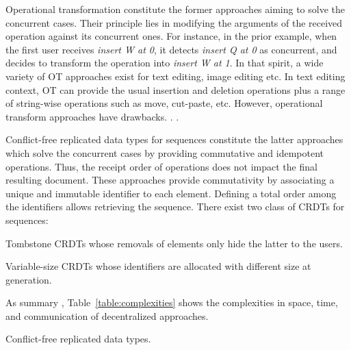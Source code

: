 \begin{asparadesc}
\item [Operational transformation] constitute the former approaches aiming to
  solve the concurrent cases. Their principle lies in modifying the arguments of
  the received operation against its concurrent ones. For instance, in the prior
  example, when the first user receives \emph{insert W at 0}, it detects
  \emph{insert Q at 0} as concurrent, and decides to transform the operation
  into \emph{insert W at 1}.  In that spirit, a wide variety of OT approaches
  exist for text editing, image editing etc. In text editing context, OT can
  provide the usual insertion and deletion operations plus a range of
  string-wise operations such as move, cut-paste, etc. However, operational
  transform approaches have drawbacks. . .
\item [Conflict-free replicated data types] for sequences constitute the latter
  approaches which solve the concurrent cases by providing commutative and
  idempotent operations. Thus, the receipt order of operations does not impact
  the final resulting document. These approaches provide commutativity by
  associating a unique and immutable identifier to each element. Defining a
  total order among the identifiers allows retrieving the sequence. There exist
  two class of CRDTs for sequences:
  \begin{inparaenum}[(i)]
  \item [Tombstone CRDTs] whose removals of elements only hide the latter to the
    users. 
  \item [Variable-size CRDTs] whose identifiers are allocated with different
    size at generation.
  \end{inparaenum}
\item [As summary], Table~\ref{table:complexities} shows the complexities in
  space, time, and communication of decentralized approaches. 
\end{asparadesc}

\begin{algorithm}
  
  \caption{\label{algo:crdtabsract}Conflict-free replicated data types.}
\end{algorithm}

